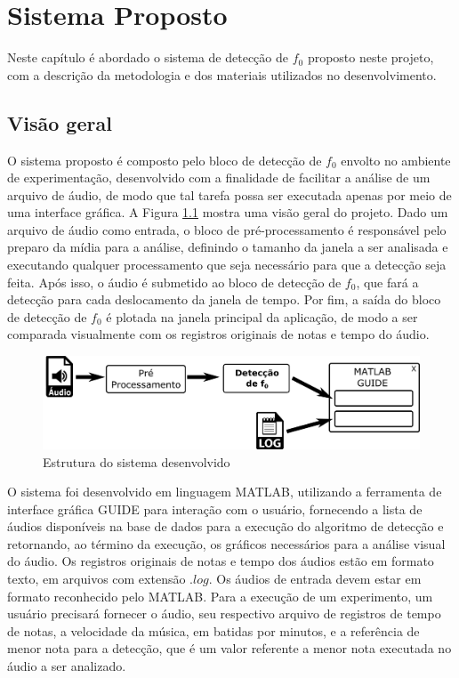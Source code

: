 \chapter{Sistema Proposto} \label{cap3}

Neste capítulo é abordado o sistema de detecção de $f_0$ proposto neste projeto, com a descrição da metodologia e dos materiais utilizados no desenvolvimento.

\section{Visão geral}

O sistema proposto é composto pelo bloco de detecção de $f_0$ envolto no ambiente de experimentação, desenvolvido com a finalidade de facilitar a análise de um arquivo de áudio, de modo que tal tarefa possa ser executada apenas por meio de uma interface gráfica. A Figura \ref{fig-system-1} mostra uma visão geral do projeto. Dado um arquivo de áudio como entrada, o bloco de pré-processamento é responsável pelo preparo da mídia para a análise, definindo o tamanho da janela a ser analisada e executando qualquer processamento que seja necessário para que a detecção seja feita. Após isso, o áudio é submetido ao bloco de detecção de $f_0$, que fará a detecção para cada deslocamento da janela de tempo. Por fim, a saída do bloco de detecção de $f_0$ é plotada na janela principal da aplicação, de modo a ser comparada visualmente com os registros originais de notas e tempo do áudio. 

\begin{figure}[h]
	\includegraphics[width=\linewidth]{pasta1_figuras/system1c.png}
	\caption{Estrutura do sistema desenvolvido}
	\label{fig-system-1}
\end{figure}

O sistema foi desenvolvido em linguagem MATLAB\rreg, utilizando a ferramenta de interface gráfica GUIDE para interação com o usuário, fornecendo a lista de áudios disponíveis na base de dados para a execução do algoritmo de detecção e retornando, ao término da execução, os gráficos necessários para a análise visual do áudio. Os registros originais de notas e tempo dos áudios estão em formato texto, em arquivos com extensão $.log$. Os áudios de entrada devem estar em formato reconhecido pelo MATLAB\rreg. Para a execução de um experimento, um usuário precisará fornecer o áudio, seu respectivo arquivo de registros de tempo de notas, a velocidade da música, em batidas por minutos, e a referência de menor nota para a detecção, que é um valor referente a menor nota executada no áudio a ser analizado.

